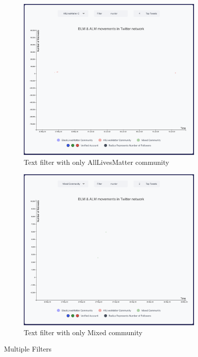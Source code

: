 \begin{figure}[H]
\begin{subfigure}{.45\textwidth}
  \centering
  \captionsetup{justification=centering}
  \includegraphics[width=0.9\linewidth]{./pics/almF.png}  
  \caption{Text filter with only AllLivesMatter community}
  \label{fig:sub-third-tfamc}
\end{subfigure}
\begin{subfigure}{.45\textwidth}
  \centering
  \captionsetup{justification=centering}
  \includegraphics[width=0.9\linewidth]{./pics/mixedF.png}  
  \caption{Text filter with only Mixed community}
  \label{fig:sub-fourth-tfmc}
\end{subfigure}
       
\captionsetup{justification=centering}
\caption{Multiple Filters}
\label{fig:e-m-filters}
\end{figure}



